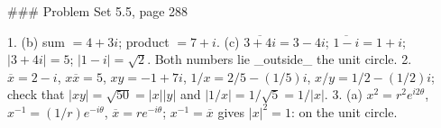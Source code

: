 ### Problem Set 5.5, page 288

1. (b) sum \(=4+3i\); product \(=7+i\). (c) \(\overline{3+4i}=3-4i\); \(\overline{1-i}=1+i\); \(|3+4i|=5\); \(|1-i|=\sqrt{2}\). Both numbers lie _outside_ the unit circle.
2. \(\overline{x}=2-i\), \(x\overline{x}=5\), \(xy=-1+7i\), \(1/x=2/5-(1/5)i\), \(x/y=1/2-(1/2)i\); check that \(|xy|=\sqrt{50}=|x||y|\) and \(|1/x|=1/\sqrt{5}=1/|x|\).
3. (a) \(x^{2}=r^{2}e^{i2\theta}\), \(x^{-1}=(1/r)e^{-i\theta}\), \(\overline{x}=re^{-i\theta}\); \(x^{-1}=\overline{x}\) gives \(|x|^{2}=1\): on the unit circle.

 